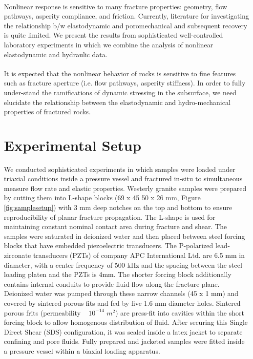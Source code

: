\documentclass[letterpaper,10pt]{article}
\begin{document}
\paragraph{} Nonlinear response is sensitive to many fracture properties: geometry, flow pathways, asperity compliance, and friction. Currently, literature for investigating the relationship b/w elastodynamic and poromechanical and subsequent recovery is quite limited. We present the results from sophisticated well-controlled laboratory experiments in which we combine the analysis of nonlinear elastodynamic and hydraulic data. 

\paragraph{} It is expected that the nonlinear behavior of rocks is sensitive to fine features such as fracture aperture (i.e. flow pathways, asperity stiffness). In order to fully under-stand the ramifications of dynamic stressing in the subsurface, we need elucidate the relationship between the elastodynamic and hydro-mechanical properties of fractured rocks. 


\pagebreak

\section{Experimental Setup}

\paragraph{} We conducted sophisticated experiments in which samples were loaded under triaxial conditions inside a pressure vessel and fractured in-situ to simultaneous measure flow rate and elastic properties. Westerly granite samples were prepared by cutting them into L-shape blocks (69 x 45 50 x 26 mm, Figure \ref{fig:samplesetup}) with 3 mm deep notches on the top and bottom to ensure reproducibility of planar fracture propagation. The L-shape is used for maintaining constant nominal contact area during fracture and shear. The samples were saturated in deionized water and then placed between steel forcing blocks that have embedded piezoelectric transducers. The P-polarized lead-zirconate transducers (PZTs) of company APC International Ltd. are 6.5 mm in diameter, with a center frequency of 500 kHz and the spacing between the steel loading platen and the PZTs is 4mm. The shorter forcing block additionally contains internal conduits to provide fluid flow along the fracture plane. Deionized water was pumped through these narrow channels (45 x 1 mm) and covered by sintered porous fits and fed by five 1.6 mm diameter holes. Sintered porous frits (permeability ~ $10^{-14}$ $m^2$) are press-fit into cavities within the short forcing block to allow homogenous distribution of fluid. After securing this Single Direct Shear (SDS) configuration, it was sealed inside a latex jacket to separate confining and pore fluids. Fully prepared and jacketed samples were fitted inside a pressure vessel within a biaxial loading apparatus.
\end{document}
